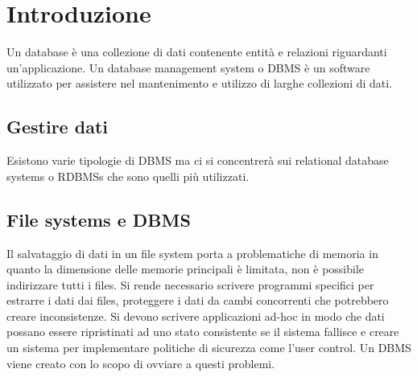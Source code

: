 \chapter{Introduzione}
Un database \`e una collezione di dati contenente entit\`a e relazioni riguardanti un'applicazione. Un database management system o DBMS \`e un software utilizzato per assistere nel mantenimento e utilizzo 
di larghe collezioni di dati.
\section{Gestire dati}
Esistono varie tipologie di DBMS ma ci si concentrer\`a sui relational database systems o RDBMSs che sono quelli pi\`u utilizzati.
\section{File systems e DBMS}
Il salvataggio di dati in un file system porta a problematiche di memoria in quanto la dimensione delle memorie principali \`e limitata, non \`e possibile indirizzare tutti i files. Si rende necessario scrivere 
programmi specifici per estrarre i dati dai files, proteggere i dati da cambi concorrenti che potrebbero creare inconsistenze. Si devono scrivere applicazioni ad-hoc in modo che dati possano essere ripristinati ad 
uno stato consistente se il sistema fallisce e creare un sistema per implementare politiche di sicurezza come l'user control. Un DBMS viene creato con lo scopo di ovviare a questi problemi.
